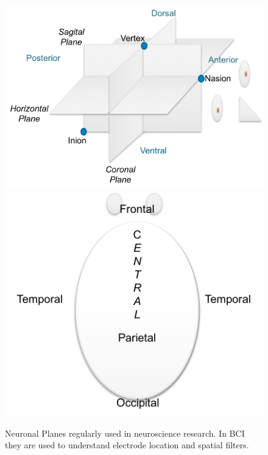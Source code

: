 \documentclass[aspectratio=169]{beamer}
\begin{document}
	
	

    

    
\begin{frame}    
\begin{figure}[htb]
\centering
\includegraphics[scale=0.4]{images/neuralplanes.png}
\includegraphics[scale=0.4]{images/neuroanatomy.png}
\caption[Neuroanatomical structures of the brain]{Neuronal Planes regularly used in neuroscience research.  In BCI they are used to understand electrode location and spatial filters.}
\label{fig:neuroanatomy}
\end{figure}
\end{frame}
\end{document}

